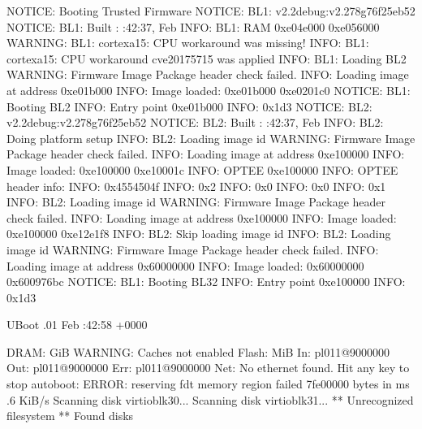 \documentclass[a4paper,10pt,oneside,english]{sphinxmanual}
\begin{document}
\begin{sphinxVerbatim}[commandchars=\\\{\}]
NOTICE:  Booting Trusted Firmware
NOTICE:  BL1: v2.2debug:v2.2\PYGZhy{}78\PYGZhy{}g76f25eb52
NOTICE:  BL1: Built : :42:37, Feb  
INFO:    BL1: RAM 0xe04e000 \PYGZhy{} 0xe056000
WARNING: BL1: cortex\PYGZus{}a15: CPU workaround   was missing!
INFO:    BL1: cortex\PYGZus{}a15: CPU workaround  cve\PYGZus{}2017\PYGZus{}5715 was applied
INFO:    BL1: Loading BL2
WARNING: Firmware Image Package header check failed.
INFO:    Loading image  at address 0xe01b000
INFO:    Image  loaded: 0xe01b000 \PYGZhy{} 0xe0201c0
NOTICE:  BL1: Booting BL2
INFO:    Entry point   0xe01b000
INFO:      0x1d3
NOTICE:  BL2: v2.2debug:v2.2\PYGZhy{}78\PYGZhy{}g76f25eb52
NOTICE:  BL2: Built : :42:37, Feb  
INFO:    BL2: Doing platform setup
INFO:    BL2: Loading image id 
WARNING: Firmware Image Package header check failed.
INFO:    Loading image  at address 0xe100000
INFO:    Image  loaded: 0xe100000 \PYGZhy{} 0xe10001c
INFO:    OPTEE 0xe100000
INFO:    OPTEE header info:
INFO:          0x4554504f
INFO:          0x2
INFO:          0x0
INFO:          0x0
INFO:          0x1
INFO:    BL2: Loading image id 
WARNING: Firmware Image Package header check failed.
INFO:    Loading image  at address 0xe100000
INFO:    Image  loaded: 0xe100000 \PYGZhy{} 0xe12e1f8
INFO:    BL2: Skip loading image id 
INFO:    BL2: Loading image id 
WARNING: Firmware Image Package header check failed.
INFO:    Loading image  at address 0x60000000
INFO:    Image  loaded: 0x60000000 \PYGZhy{} 0x600976bc
NOTICE:  BL1: Booting BL32
INFO:    Entry point   0xe100000
INFO:      0x1d3


U\PYGZhy{}Boot .01 Feb   \PYGZhy{} :42:58 +0000

DRAM:   GiB
WARNING: Caches not enabled
Flash:  MiB
In:    pl011@9000000
Out:   pl011@9000000
Err:   pl011@9000000
Net:   No ethernet found.
Hit any key to stop autoboot:  
ERROR: reserving fdt memory region failed 7fe00000 
 bytes  in  ms .6 KiB/s
Scanning disk virtio\PYGZhy{}blk\PYGZsh{}30...
Scanning disk virtio\PYGZhy{}blk\PYGZsh{}31...
** Unrecognized filesystem  **
Found  disks


\end{sphinxVerbatim}
\end{document}
